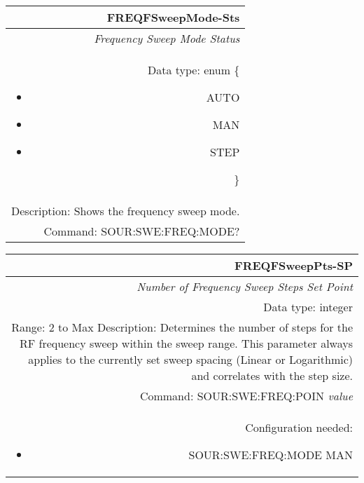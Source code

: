 \documentclass[openany]{article}
\begin{document}
		\begin{tabular}{N}
			\hline
			\bfseries FREQFSweepMode-Sts \\ \hline
			\emph{Frequency Sweep Mode Status} \\
			Data type: enum \{\begin{itemize}[noitemsep]
				\small
				\item[] AUTO
				\item[] MAN
				\item[] STEP
			\end{itemize}\} \\
			Description: Shows the frequency sweep mode. \\
			Command: SOUR:SWE:FREQ:MODE? \\

		\end{tabular}
%
		\begin{tabular}{N}
			\hline
			\bfseries FREQFSweepPts-SP \\ \hline
			\emph{Number of Frequency Sweep Steps Set Point} \\
			Data type: integer \\
			Range: 2 to Max
			Description: Determines the number of steps for the RF frequency sweep within the sweep range. This parameter always applies to the currently set sweep spacing (Linear or Logarithmic) and correlates with the step size. \\
			Command: SOUR:SWE:FREQ:POIN \emph{value} \\
			Configuration needed: \begin{itemize}[noitemsep]
				\small
				\item[] SOUR:SWE:FREQ:MODE MAN
			\end{itemize} \\
		
		\end{tabular}
\end{document}
